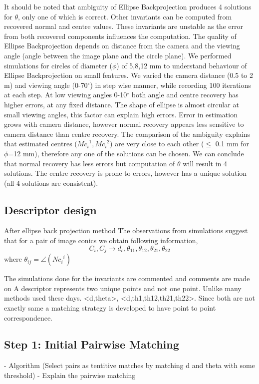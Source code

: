 \documentclass{bmvc2k}
\begin{document}
It should be noted that ambiguity of Ellipse Backprojection produces 4 solutions for $\theta$, only one of which is correct. 
Other invariants can be computed from recovered normal and centre values. These invariants are unstable \cite{forsyth_91} as the error from both recovered components influences the computation.
The quality of Ellipse Backprojection depends on distance from the camera and the viewing angle (angle between the image plane and the circle plane)\cite{werghi_pose_1996}. 
We performed simulations for circles of diameter ($\phi$) of 5,8,12 mm to understand behaviour of Ellipse Backprojection on small features. We varied the camera distance (0.5 to 2 m) and viewing angle (0-70$^\circ$) in step wise manner, while recording 100 iterations at each step.
At low viewing angles 0-10$^\circ$ both angle and centre recovery has higher errors, at any fixed distance. 
The shape of ellipse is almost circular at small viewing angles, this factor can explain high errors. 
Error in estimation grows with camera distance, however normal recovery appears less sensitive to camera distance than centre recovery. The comparison of the ambiguity explains that estimated centres ($ {Mc_i}^1,{Mc_i}^2 $) are very close to each other ($\leq$ 0.1 mm for $\phi$=12 mm), therefore any one of the solutions can be chosen. We can conclude that normal recovery has less errors but computation of $\theta$ will result in 4 solutions. The centre recovery is prone to errors, however has a unique solution (all 4 solutions are consistent).

\subsection{Descriptor design}
After ellipse back projection method 
The observations from simulations suggest that for a pair of image conics we obtain following information, 
\[ 
C_i,C_j \rightarrow d_c,\theta_{11},\theta_{12},\theta_{21},\theta_{22}
\]
where $\theta_{ij} = \angle ({Nc_i}^i)$


The simulations done for the invariants are commented and comments are made on 
A descriptor represents two unique points and not one point. Unlike many methods used these days. 
<d,theta>, <d,th1,th12,th21,th22>. 
Since both are not exactly same a matching strategy is developed to have point to point correspondence.    
\subsection{Step 1: Initial Pairwise Matching}
- Algorithm (Select pairs as tentitive matches by matching d and theta with some threshold)
- Explain the pairwise matching 
\end{document}
